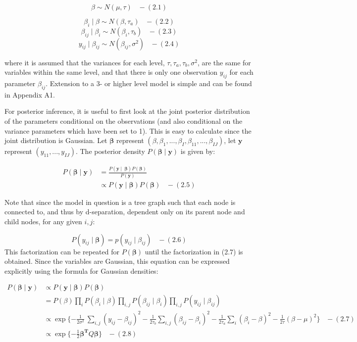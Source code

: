 \documentclass[]{article}
\begin{document}
\[\beta \sim  N( \mu, \tau) \;\;\;- (2.1)\]

\[\beta_i \;|\; \beta \sim N( \beta, \tau_a) \;\;\; - (2.2)\]
\[\beta_{ij} \;|\; \beta_i \sim N( \beta_i, \tau_b) \;\;\; - (2.3)\]
\[y_{ij} \;|\; \beta_{ij} \sim N( \beta_{ij}, \sigma^2) \;\;\; - (2.4)\]

where it is assumed that the variances for each level,
\(\tau, \tau_a, \tau_b, \sigma^2\), are the same for variables within
the same level, and that there is only one observation \(y_{ij}\) for
each parameter \(\beta_{ij}\). Extension to a 3- or higher level model
is simple and can be found in Appendix A1.

For posterior inference, it is useful to first look at the joint
posterior distribution of the parameters conditional on the observations
(and also conditional on the variance parameters which have been set to
1). This is easy to calculate since the joint distribution is Gaussian.
Let \(\boldsymbol{\beta}\) represent
\((\beta, \beta_1, ..., \beta_I, \beta_{11}, ..., \beta_{IJ})\), let
\(\boldsymbol{y}\) represent \((y_{11}, ..., y_{IJ})\). The posterior
density \(P(\boldsymbol{\beta} \; | \; \boldsymbol{y})\) is given by:

\[
\begin{aligned} 
P(\boldsymbol{\beta} \;|\;\boldsymbol{y}) &= \frac{P(\boldsymbol{y} \;|\;\ \boldsymbol{\beta}) P(\boldsymbol{\beta})}{P(\boldsymbol{y})} \\
&\propto P(\boldsymbol{y}\;|\; \boldsymbol{\beta}) P(\boldsymbol{\beta})\;\;\; - (2.5)
\end{aligned}
\]

Note that since the model in question is a tree graph such that each
node is connected to, and thus by d-separation, dependent only on its
parent node and child nodes, for any given \(i,j\):

\[P(y_{ij} \;|\; \boldsymbol{\beta}) = p(y_{ij} \;|\; \beta_{ij}) \;\;\; - (2.6)\]
This factorization can be repeated for \(P(\boldsymbol{\beta})\) until
the factorization in (2.7) is obtained. Since the variables are
Gaussian, this equation can be expressed explicitly using the formula
for Gaussian densities:

\[ 
\begin{aligned}
P(\boldsymbol{\beta} \;|\;\boldsymbol{y}) &\propto P(\boldsymbol{y}\;|\; \boldsymbol{\beta}) P(\boldsymbol{\beta}) \\  &=  P(\beta) \prod_{i} P(\beta_i \;|\; \beta) \prod_{i,j}P(\beta_{ij} \;|\; \beta_i)  \prod_{i,j}P(y_{ij} \;|\; \beta_{ij}) \\
&\propto \exp\{-\frac{1}{2\sigma^2}\ \sum_{i,j} (y_{ij}-\beta_{ij})^2 - \frac{1}{2\tau_b}\sum_{i,j} (\beta_{ij}-\beta_{i})^2 - \frac{1}{2\tau_a} \sum_{i} (\beta_{i}-\beta)^2 -\frac{1}{2\tau}(\beta - \mu)^2 \}\;\;\; - (2.7)\\
&\propto \exp\{-\frac{1}{2} \boldsymbol{\beta^{T}} Q \boldsymbol{\beta}\} \;\;\; - (2.8)
\end{aligned}
\]
\end{document}
